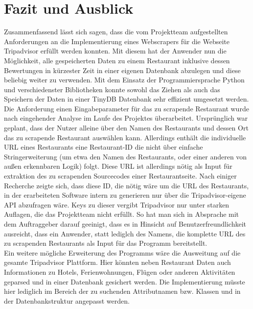\documentclass[a4paper,oneside,12pt]{report}
\begin{document}
		
	


	\chapter[Fazit und Ausblick - Anja Wolf]{Fazit und Ausblick}
	
		Zusammenfassend lässt sich sagen, dass die vom Projektteam aufgestellten Anforderungen an die Implementierung eines Webscrapers für die Webseite Tripadvisor erfüllt werden konnten. Mit diesem hat der Anwender nun die Möglichkeit, alle gespeicherten Daten zu einem Restaurant inklusive dessen Bewertungen in kürzester Zeit in einer eigenen Datenbank abzulegen und diese beliebig weiter zu verwenden. Mit dem Einsatz der Programmiersprache Python und verschiedenster Bibliotheken konnte sowohl das Ziehen als auch das Speichern der Daten in einer TinyDB Datenbank sehr effizient umgesetzt werden.  
		\\
		Die Anforderung einen Eingabeparameter für das zu scrapende Restaurant wurde nach eingehender Analyse im Laufe des Projektes  überarbeitet. Ursprünglich war geplant, dass der Nutzer alleine über den Namen des Restaurants und dessen Ort das zu scrapende Restaurant auswählen kann. Allerdings enthält die individuelle URL eines Restaurants eine Restaurant-ID die nicht über einfache Stringerweiterung (um etwa den Namen des Restaurants, oder einer anderen von außen erkennbaren Logik) folgt. Diese URL ist allerdings nötig als Input für extraktion des zu scrapenden Sourcecodes einer Restaurantseite. Nach einiger Recherche zeigte sich, dass diese ID, die nötig wäre um die URL des Restaurants, in der erarbeiteten Software intern zu generieren nur über die Tripadvisor-eigene API abzufragen wäre. Keys zu dieser vergibt Tripadvisor nur unter starken Auflagen, die das Projektteam nicht erfüllt. So hat man sich in Absprache mit dem Auftraggeber darauf geeinigt, dass es in Hinsicht auf Benutzerfreundlichkeit ausreicht, dass ein Anwender, statt lediglch des Namens, die komplette URL des zu scrapenden Restaurants als Input für das Programm bereitstellt.  
		\\
		Ein weitere mögliche Erweiterung des Programms wäre die Ausweitung auf die gesamte Tripadvisor Plattform. Hier könnten neben Restaurant Daten auch Informationen zu Hotels, Ferienwohnungen, Flügen oder anderen Aktivitäten geparsed und in einer Datenbank gesichert werden. Die Implementierung müsste hier lediglich im Bereich der zu suchenden Attributnamen bzw. Klassen und in der Datenbankstruktur angepasst werden.
		\\
		
\end{document}
